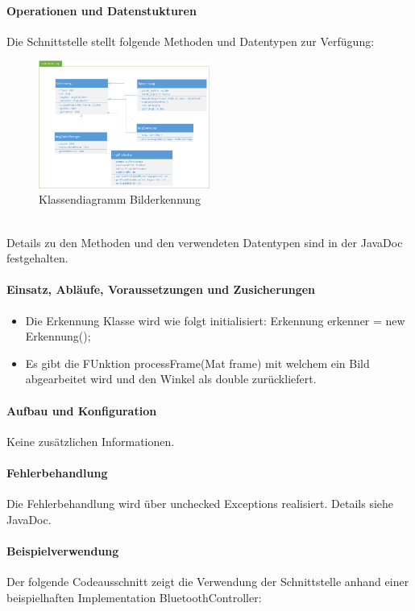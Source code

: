 \paragraph{Operationen und Datenstukturen}

Die Schnittstelle stellt folgende Methoden und Datentypen zur Verfügung:  \\
\begin{figure}[h!]          
	\centering             
	\includegraphics[width=0.5\textwidth]{fig/Klassendiagramm_Erkennung.png}
	\caption{Klassendiagramm Bilderkennung}
	\label{fig:Klassendiagramm Bilderkennung}        
\end{figure} \\
Details zu den Methoden und den verwendeten Datentypen sind in der JavaDoc festgehalten. \\

\paragraph{Einsatz, Abläufe, Voraussetzungen und Zusicherungen}
\begin{itemize}
	\item{Die Erkennung Klasse wird wie folgt initialisiert: Erkennung erkenner = new Erkennung(); }
	\item{Es gibt die FUnktion processFrame(Mat frame) mit welchem ein Bild abgearbeitet wird und den Winkel als double zurückliefert.}
\end{itemize}

\paragraph{Aufbau und Konfiguration} 
Keine zusätzlichen Informationen. \\

\paragraph{Fehlerbehandlung}
Die Fehlerbehandlung wird über unchecked Exceptions realisiert. Details siehe JavaDoc. \\

\paragraph{Beispielverwendung}
Der folgende Codeausschnitt zeigt die Verwendung der Schnittstelle anhand einer beispielhaften Implementation BluetoothController: \\

